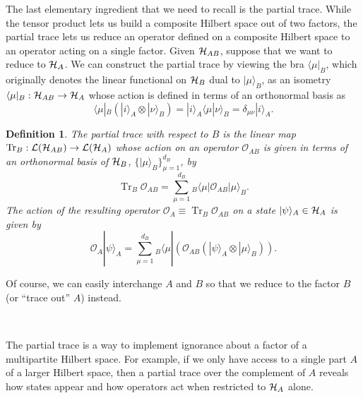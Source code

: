 \documentclass[a4paper,11pt]{article}
\newtheorem{defn}[thm]{Definition}
\DeclareMathOperator{\Tr}{Tr}
\newcommand{\bra}[1]{\langle #1|}
\newcommand{\ket}[1]{|#1\rangle}
\newcommand{\braket}[2]{\langle #1|#2\rangle}
\newcommand{\Hil}{{\cal H}}
\newcommand{\Oh}{{\mathcal{O}}}
\newcommand{\Lin}{{\mathcal{L}}}
\newcommand{\Note}{\noindent {\bf Note:~}}
\begin{document}
The last elementary ingredient that we need to recall is the partial trace.
While the tensor product lets us build a composite Hilbert space out of two factors, the partial trace lets us reduce an operator defined on a composite Hilbert space to an operator acting on a single factor.
Given $\Hil_{AB}$, suppose that we want to reduce to $\Hil_A$.
We can construct the partial trace by viewing the bra $\bra{\mu}_B$, which originally denotes the linear functional on $\Hil_B$ dual to $\ket{\mu}_B$, as an isometry $\bra{\mu}_B : \Hil_{AB} \rightarrow \Hil_{A}$ whose action is defined in terms of an orthonormal basis as
\begin{equation}
\bra{\mu}_B \left(\ket{i}_A \otimes \ket{\nu}_B\right) = \ket{i}_A \braket{\mu}{\nu}_B = \delta_{\mu \nu} \ket{i}_A.
\end{equation}

\begin{defn}
The \emph{partial trace} with respect to $B$ is the linear map $\Tr_B : \Lin(\Hil_{AB}) \rightarrow \Lin(\Hil_A)$ whose action on an operator $\Oh_{AB}$ is given in terms of an orthonormal basis of $\Hil_B$, $\{\ket{\mu}_B\}_{\mu = 1}^{d_B}$, by
\begin{equation*}
\Tr_B \Oh_{AB} = \sum_{\mu = 1}^{d_B} {}_B\bra{\mu} \Oh_{AB} \ket{\mu}_B .
\end{equation*}
The action of the resulting operator $\Oh_A \equiv \Tr_B \Oh_{AB}$ on a state $\ket{\psi}_A \in \Hil_A$ is given by
\begin{equation*}
\Oh_A \ket{\psi}_A = \sum_{\mu = 1}^{d_B} {}_B\bra{\mu} \left( \Oh_{AB} (\ket{\psi}_A \otimes \ket{\mu}_B) \right).
\end{equation*}
\end{defn}
\Note Of course, we can easily interchange $A$ and $B$ so that we reduce to the factor $B$ (or ``trace out'' $A$) instead.

~

The partial trace is a way to implement ignorance about a factor of a multipartite Hilbert space.
For example, if we only have access to a single part $A$ of a larger Hilbert space, then a partial trace over the complement of $A$ reveals how states appear and how operators act when restricted to $\Hil_A$ alone.
\end{document}
